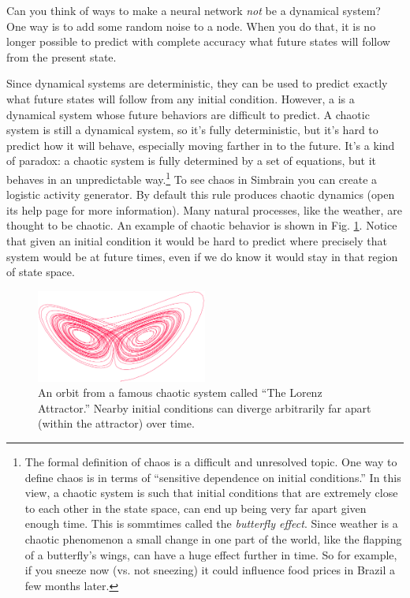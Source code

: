 Can you think of ways to make a neural network {\em not} be a dynamical 
system?  One way is to add some random noise to a node. When you do that, it 
is no longer possible to predict with complete accuracy what future states will follow from the present state.

Since dynamical systems are deterministic, they can be used to predict exactly what future states will follow from any initial condition. However, a  is a dynamical system whose future behaviors are difficult to predict. A chaotic system is still a dynamical system, so it's fully deterministic, but it's hard to predict how it will behave, especially moving farther in to the future. It's a kind of paradox: a chaotic system is fully determined by a set of equations, but it behaves in an unpredictable way.\footnote{The formal definition of chaos is a difficult and unresolved topic. One way to define chaos is in terms of ``sensitive dependence on initial conditions.'' In this view, a chaotic system is such that initial conditions that are extremely close to each other in the state space, can end up being very far apart given enough time. This is sommtimes called the \emph{butterfly effect}. Since weather is a chaotic phenomenon a small change in one part of the world, like the flapping of a butterfly's wings, can have a huge effect further in time. So for example, if you sneeze now (vs. not sneezing) it could influence food prices in Brazil a few months later.} To see chaos in Simbrain you can create a logistic activity generator. By default this rule produces chaotic dynamics (open its help page for more information). Many natural processes, like the weather, are thought to be chaotic. An example of chaotic behavior is shown in Fig. \ref{F:chaoticStateSpace}. Notice that given an initial condition it would be hard to predict where precisely that system would be at future times, even if we do know it would stay in that region of state space.

\begin{figure}[h]
\centering
\includegraphics[width=0.5\textwidth]{./images/lorenzAttractor.png}
\caption[\url{https://commons.wikimedia.org/wiki/File:Lorenz_attractor2.svg}.]{An orbit from a famous chaotic system called ``The Lorenz Attractor.'' Nearby initial conditions can diverge arbitrarily far apart (within the attractor) over time. }
\label{F:chaoticStateSpace}
\end{figure}

